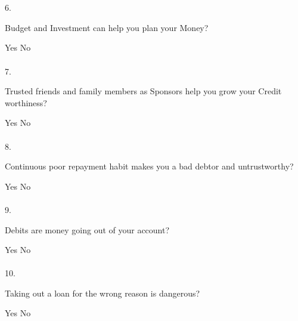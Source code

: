 \documentclass[a5paper]{sdapsclassic}
\begin{document}
\begin{questionnaire}
{		%
		\\
		\\
		6.\hspace{6pt}\begin{minipage}{40em}Budget and Investment can help you plan your Money? \end{minipage}\break
		\hspace{25pt}\textcolor{black}{\mycheckbox{}{}}Yes\hspace{8pt}%
		\textcolor{black}{\mycheckbox{}{}}No%
		\\
		\\
		7.\hspace{6pt}\begin{minipage}{35em}\begin{flushleft}Trusted friends and family members as Sponsors help you grow your Credit worthiness?\end{flushleft}\end{minipage}\break
		\hspace{25pt}\textcolor{black}{\mycheckbox{}{}}Yes\hspace{8pt}%
		\textcolor{black}{\mycheckbox{}{}}No%
		\\
		\\
		8.\hspace{6pt}\begin{minipage}{35em}Continuous poor repayment habit makes you a bad debtor and untrustworthy?\end{minipage}\break
		\hspace{25pt}\textcolor{black}{\mycheckbox{}{}}Yes\hspace{8pt}%
		\textcolor{black}{\mycheckbox{}{}}No%
		\\
		\\
		9.\hspace{6pt}\begin{minipage}{40em}Debits are money going out of your account? \end{minipage}\break
		\hspace{25pt}\textcolor{black}{\mycheckbox{}{}}Yes\hspace{8pt}%
		\textcolor{black}{\mycheckbox{}{}}No%
		\\
		\\
		10.\hspace{2pt}\begin{minipage}{40em}Taking out a loan for the wrong reason is dangerous? \end{minipage}\break
		\hspace{25pt}\textcolor{black}{\mycheckbox{}{}}Yes\hspace{8pt}%
		\textcolor{black}{\mycheckbox{}{}}No%
		}
	\end{questionnaire}
\end{document}
